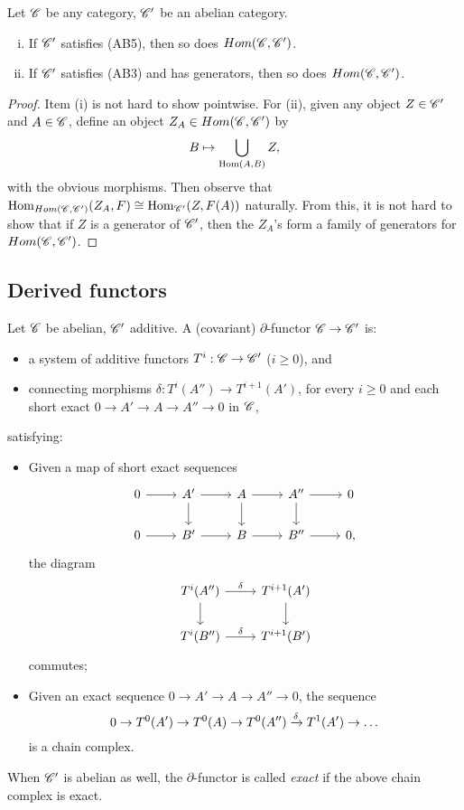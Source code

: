 \documentclass[11pt]{amsart}
\begin{document}
\begin{prop}
    Let $\mathscr{C}$ be any category, $\mathscr{C}'$ be an abelian category.
    \begin{enumerate}[(i)]
        \item If $\mathscr{C}'$ satisfies (AB5), then so does $Hom(\mathscr{C}, \mathscr{C}')$.
        \item If $\mathscr{C}'$ satisfies (AB3) and has generators, then so does $Hom(\mathscr{C}, \mathscr{C}')$.
    \end{enumerate}
\end{prop}

\begin{proof}
    Item (i) is not hard to show pointwise. For (ii), given any object $Z\in \mathscr{C}'$ and $A\in \mathscr{C}$, define an object $Z_A\in Hom(\mathscr{C}, \mathscr{C}')$ by
    \[B \mapsto \bigcup_{\operatorname{Hom}(A,B)} Z,\]
    with the obvious morphisms. Then observe that $\operatorname{Hom}_{Hom(\mathscr{C}, \mathscr{C}')}(Z_A, F) \cong \operatorname{Hom}_{\mathscr{C}'}(Z, F(A))$ naturally. From this, it is not hard to show that if $Z$ is a generator of $\mathscr{C}'$, then the $Z_A$'s form a family of generators for $Hom(\mathscr{C}, \mathscr{C}')$.
\end{proof}


\subsection{Derived functors}

\begin{defn}
    Let $\mathscr{C}$ be abelian, $\mathscr{C}'$ additive. A (covariant) $\partial$-functor $\mathscr{C}\to \mathscr{C}'$ is:
    \begin{itemize}
        \item a system of additive functors $T^i: \mathscr{C}\to \mathscr{C}'$ ($i\ge 0$), and
        \item connecting morphisms $\delta: T^i(A'') \to T^{i+1}(A')$, for every $i\ge 0$ and each short exact $0\to A'\to A\to A''\to 0$ in $\mathscr{C}$,
    \end{itemize}
    satisfying:
    \begin{itemize}
        \item Given a map of short exact sequences
        \[
        \begin{tikzcd}
            0 \arrow[r] & A' \arrow[r] \arrow[d] & A \arrow[r] \arrow[d] & A'' \arrow[r] \arrow[d] & 0 \\
            0 \arrow[r] & B' \arrow[r] & B \arrow[r] & B'' \arrow[r] & 0,
        \end{tikzcd}
        \]
        the diagram
        \[
        \begin{tikzcd}
            T^i(A'') \arrow[r, "\delta"] \arrow[d] & T^{i+1}(A') \arrow[d] \\
            T^i(B'') \arrow[r, "\delta"] & T^{i+1}(B')
        \end{tikzcd}
        \]
        commutes;
        \item Given an exact sequence $0\to A'\to A \to A''\to 0$, the sequence
        \[0 \to T^0(A') \to T^0(A) \to T^0(A'') \xrightarrow{\delta} T^1(A') \to\dots\]
        is a chain complex.
    \end{itemize}
    When $\mathscr{C}'$ is abelian as well, the $\partial$-functor is called \emph{exact} if the above chain complex is exact.
\end{defn}
\end{document}
